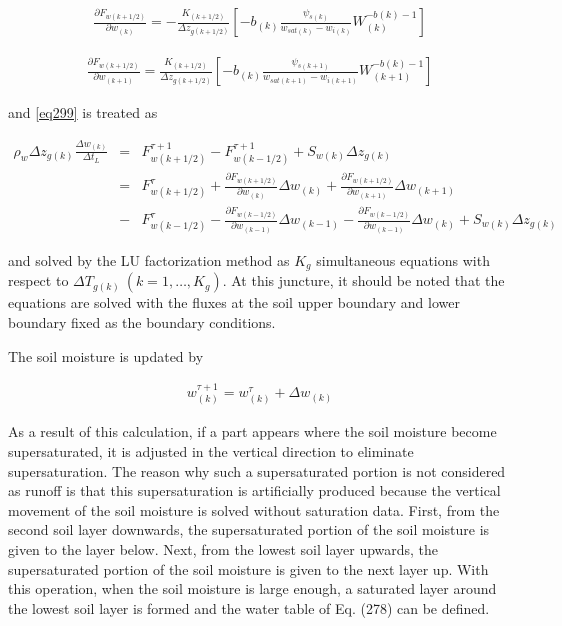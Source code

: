 \begin{eqnarray}
 \frac{\partial {F}_{w(k+1/2)}}{\partial w_{(k)}} =
- \frac{K_{(k+1/2)}}{\Delta z_{g(k+1/2)}}
\left[
-b_{(k)} \frac{\psi_{s(k)}}{w_{sat(k)}-w_{i(k)}}W_{(k)}^{-b(k)-1}
\right]
\end{eqnarray}

\begin{eqnarray}
 \frac{\partial {F}_{w(k+1/2)}}{\partial w_{(k+1)}} =
 \frac{K_{(k+1/2)}}{\Delta z_{g(k+1/2)}}
\left[
-b_{(k)} \frac{\psi_{s(k+1)}}{w_{sat(k+1)}-w_{i(k+1)}}W_{(k+1)}^{-b(k)-1}
\right]
\end{eqnarray}

and \ref{eq299} is treated as

\begin{eqnarray}
\rho_w \Delta z_{g(k)} \frac{\Delta w_{(k)}}{\Delta t_L}
&=& F_{w(k+1/2)}^{\tau+1} - {F}_{w(k-1/2)}^{\tau+1} + S_{w(k)} \Delta z_{g(k)} \nonumber\\
&=& {F}_{w(k+1/2)}^{\tau}
+\frac{\partial F_{w(k+1/2)}}{\partial w_{(k)}}
 \Delta w_{(k)}
+\frac{\partial F_{w(k+1/2)}}{\partial w_{(k+1)}}
 \Delta w_{(k+1)}  \\
&-& F_{w(k-1/2)}^{\tau}
-\frac{\partial F_{w(k-1/2)}}{\partial w_{(k-1)}}
 \Delta w_{(k-1)}
-\frac{\partial F_{w(k-1/2)}}{\partial w_{(k-1)}}
 \Delta w_{(k)} + S_{w(k)} \Delta z_{g(k)}  \nonumber
\end{eqnarray}

and solved by the LU factorization method as \(K_g\) simultaneous equations with respect to \(\Delta T_{g(k)}\ (k=1,\ldots,K_{g})\). At this juncture, it should be noted that the equations are solved
with the fluxes at the soil upper boundary and lower boundary fixed as the boundary conditions.

The soil moisture is updated by

\begin{eqnarray}
 w_{(k)}^{\tau+1} = w_{(k)}^{\tau} + \Delta w_{(k)}
\end{eqnarray}

As a result of this calculation, if a part appears where the soil moisture become supersaturated, it is adjusted in the vertical direction to eliminate supersaturation. The reason why such a
supersaturated portion is not considered as runoff is that this supersaturation is artificially produced because the vertical movement of the soil moisture is solved without saturation data. First,
from the second soil layer downwards, the supersaturated portion of the soil moisture is given to the layer below. Next, from the lowest soil layer upwards, the supersaturated portion of the soil
moisture is given to the next layer up. With this operation, when the soil moisture is large enough, a saturated layer around the lowest soil layer is formed and the water table of Eq. (278) can be
defined.

